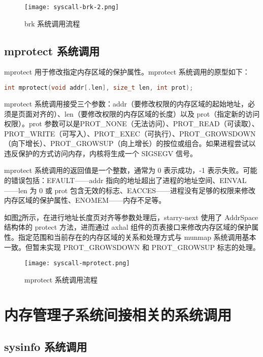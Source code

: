 \begin{figure}[H]
    \centering
    \texttt{[image: syscall-brk-2.png]}
    \caption{brk 系统调用流程}
    \label{fig:brk}
\end{figure}

\subsection{mprotect 系统调用}

mprotect 用于修改指定内存区域的保护属性。mprotect 系统调用的原型如下：
\begin{lstlisting}[language=c, caption=mprotect 系统调用函数原型]
int mprotect(void addr[.len], size_t len, int prot);
\end{lstlisting}

mprotect 系统调用接受三个参数：addr（要修改权限的内存区域的起始地址，必须是页面对齐的）、len（要修改权限的内存区域的长度）以及 prot（指定新的访问权限）。prot 参数可以是PROT\_NONE（无法访问）、PROT\_READ（可读取）、PROT\_WRITE（可写入）、PROT\_EXEC（可执行）、PROT\_GROWSDOWN（向下增长）、PROT\_GROWSUP（向上增长）的按位或组合。如果进程尝试以违反保护的方式访问内存，内核将生成一个 SIGSEGV 信号。

mprotect 系统调用的返回值是一个整数，通常为 0 表示成功，-1 表示失败。可能的错误包括：EFAULT——addr 指向的地址超出了进程的地址空间、EINVAL——len 为 0 或 prot 包含无效的标志、EACCES——进程没有足够的权限来修改内存区域的保护属性、ENOMEM——内存不足等。

如图\ref{fig:mprotect}所示，在进行地址长度页对齐等参数处理后，starry-next 使用了 AddrSpace 结构体的 protect 方法，进而通过 axhal 组件的页表接口来修改内存区域的保护属性。指定范围和当前存在的内存区域的关系和处理方式与 munmap 系统调用基本一致。但暂未实现 PROT\_GROWSDOWN 和 PROT\_GROWSUP 标志的处理。

\begin{figure}[H]
    \centering
    \texttt{[image: syscall-mprotect.png]}
    \caption{mprotect 系统调用流程}
    \label{fig:mprotect}
\end{figure}

\section{内存管理子系统间接相关的系统调用}

\subsection{sysinfo 系统调用}

